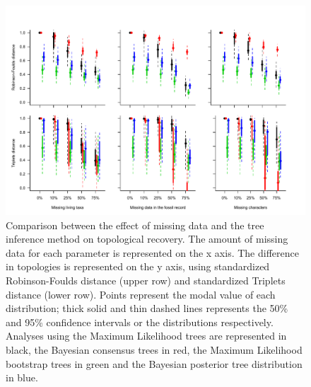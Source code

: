 \documentclass[12pt,letterpaper]{article}
\begin{document}
\begin{figure} 
\centering
    \includegraphics[width=1\textwidth]{Figures/In_main/AllMethods-RF+Tr-colour.pdf}
\caption{Comparison between the effect of missing data and the tree inference method on topological recovery. The amount of missing data for each parameter is represented on the x axis. The difference in topologies is represented on the y axis, using standardized Robinson-Foulds distance (upper row) and standardized Triplets distance (lower row). Points represent the modal value of each distribution; thick solid and thin dashed lines represents the 50\% and 95\% confidence intervals or the distributions respectively. Analyses using the Maximum Likelihood trees are represented in black, the Bayesian consensus %
trees in red, the Maximum Likelihood bootstrap trees in green and the Bayesian posterior tree distribution in blue.}
\label{Fig_Results-permeth_perparam} %
\end{figure}


\end{document}
